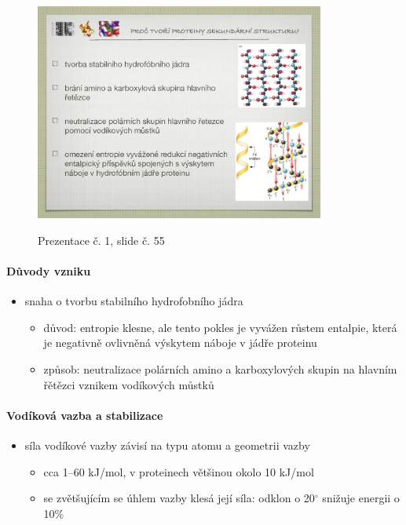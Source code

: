 \documentclass[DIV=8]{scrreprt}
\begin{document}
\begin{figure}
    \caption{Prezentace č. 1, slide č. 55}
    \includegraphics[width=0.85\textwidth]{slides-1/slide-55.jpg}
    \centering
    \label{slides-1-slide-55}
\end{figure}

\paragraph{Důvody vzniku}
\begin{itemize}[nosep]
    \item snaha o tvorbu stabilního hydrofobního jádra
\begin{itemize}[nosep]
    \item důvod: entropie klesne, ale tento pokles je vyvážen růstem entalpie, která je negativně ovlivněná výskytem náboje v jádře proteinu
    \item způsob: neutralizace polárních amino a karboxylových skupin na hlavním řětězci vznikem vodíkových můstků
\end{itemize}

\end{itemize}



\paragraph{Vodíková vazba a stabilizace}
\begin{itemize}[nosep]
    \item síla vodíkové vazby závisí na typu atomu a geometrii vazby
\begin{itemize}[nosep]
    \item cca 1--60 kJ/mol, v proteinech většinou okolo 10 kJ/mol
    \item se zvětšujícím se úhlem vazby klesá její síla: odklon o 20\(^{\circ}\) snižuje energii o 10\%
\end{itemize}

\end{itemize}
\end{document}
